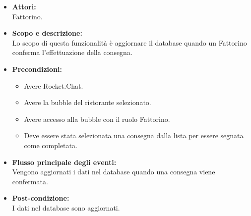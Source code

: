 
\begin{itemize}
	\item \textbf{Attori:}
	\\Fattorino.
	\item \textbf{Scopo e descrizione:} 
	\\Lo scopo di questa funzionalità è aggiornare il database quando un Fattorino conferma l'effettuazione della consegna.
	\item \textbf{Precondizioni:}
	\begin{itemize}
		\item Avere Rocket.Chat.
		\item Avere la bubble del ristorante selezionato.
		\item Avere accesso alla bubble con il ruolo Fattorino.
		\item Deve essere stata selezionata una consegna dalla lista per essere segnata come completata.
	\end{itemize}
	\item \textbf{Flusso principale degli eventi:}
	\\Vengono aggiornati i dati nel database quando una consegna viene confermata.
	\item \textbf{Post-condizione:}
	\\I dati nel database sono aggiornati.
\end{itemize}